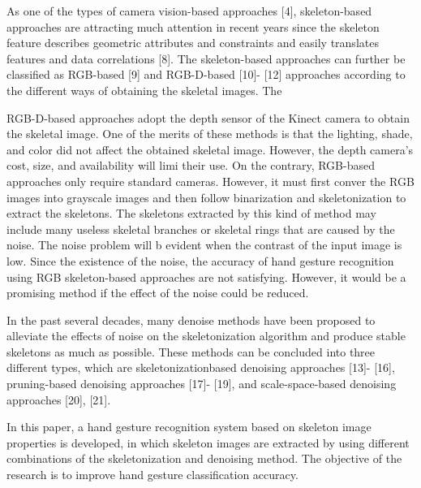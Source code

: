 \documentclass{article}
\begin{document}
\begin{multicols}{2}
\begin{minipage}[t]{0.47\textwidth}
\hspace{0.2cm}As one of the types of camera vision-based approaches [4], skeleton-based approaches are attracting much attention in recent years since the skeleton feature describes geometric attributes and constraints and easily translates features and data correlations [8]. The skeleton-based approaches can further be classified as RGB-based [9] and RGB-D-based [10]- [12] approaches according to the different ways of obtaining the skeletal images. The

\end {minipage}

\raggedleft
\begin{minipage}[t]{0.48\textwidth}
\vspace*{1.25cm}
RGB-D-based approaches adopt the depth sensor of the Kinect camera to obtain the skeletal image. One of the merits of these methods is that the lighting, shade, and color did not affect the obtained skeletal image. However, the depth camera’s cost, size, and availability will limi their use. On the contrary, RGB-based approaches only require standard cameras. However, it must first conver the RGB images into grayscale images and then follow binarization and skeletonization to extract the skeletons. The skeletons extracted by this kind of method may include many useless skeletal branches or skeletal rings that are caused by the noise. The noise problem will b evident when the contrast of the input image is low. Since the existence of the noise, the accuracy of hand gesture recognition using RGB skeleton-based approaches are not satisfying. However, it would be a promising method if the effect of the noise could be reduced. 

\hspace{0.2cm}In the past several decades, many denoise methods have been proposed to alleviate the effects of noise on the skeletonization algorithm and produce stable skeletons as much as possible. These methods can be concluded into three different types, which are skeletonizationbased denoising approaches [13]- [16], pruning-based denoising approaches [17]- [19], and scale-space-based denoising approaches [20], [21].

\hspace{0.2cm}In this paper, a hand gesture recognition system based on skeleton image properties is developed, in which skeleton images are extracted by using different combinations of the skeletonization and denoising method. The objective of the research is to improve hand gesture classification accuracy.


\end{minipage}
\end{multicols}
\end{document}
